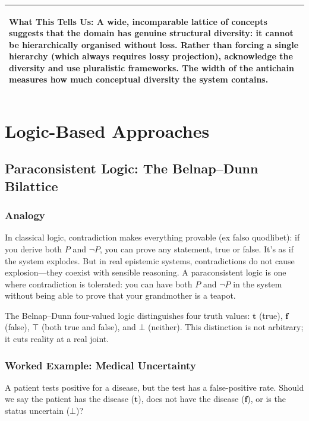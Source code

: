 \documentclass[11pt,letterpaper]{article}
\theoremstyle{definition}
\theoremstyle{remark}
\newenvironment{insightbox}{%
  \vspace{0.3cm}%
  \noindent\begin{tabular}{|p{\dimexpr\textwidth-4\tabcolsep-2\arrayrulewidth}|}
  \hline
  \small\itshape\color{accent}
}{%
  \\ \hline
  \end{tabular}
  \vspace{0.3cm}
}
\begin{document}
\begin{insightbox}
\textbf{What This Tells Us:} A wide, incomparable lattice of concepts suggests that the domain has genuine structural diversity: it cannot be hierarchically organised without loss. Rather than forcing a single hierarchy (which always requires lossy projection), acknowledge the diversity and use pluralistic frameworks. The width of the antichain measures how much conceptual diversity the system contains.
\end{insightbox}

\newpage

\section{Logic-Based Approaches}
\label{sec:logic}

\subsection{Paraconsistent Logic: The Belnap--Dunn Bilattice}
\label{sec:paraconsistent}

\subsubsection*{Analogy}

In classical logic, contradiction makes everything provable (ex falso quodlibet): if you derive both $P$ and $\neg P$, you can prove any statement, true or false. It's as if the system explodes. But in real epistemic systems, contradictions do not cause explosion---they coexist with sensible reasoning. A paraconsistent logic is one where contradiction is tolerated: you can have both $P$ and $\neg P$ in the system without being able to prove that your grandmother is a teapot.

The Belnap--Dunn four-valued logic distinguishes four truth values: $\mathbf{t}$ (true), $\mathbf{f}$ (false), $\top$ (both true and false), and $\bot$ (neither). This distinction is not arbitrary; it cuts reality at a real joint.

\subsubsection*{Worked Example: Medical Uncertainty}

A patient tests positive for a disease, but the test has a false-positive rate. Should we say the patient has the disease ($\mathbf{t}$), does not have the disease ($\mathbf{f}$), or is the status uncertain ($\bot$)?
\end{document}
